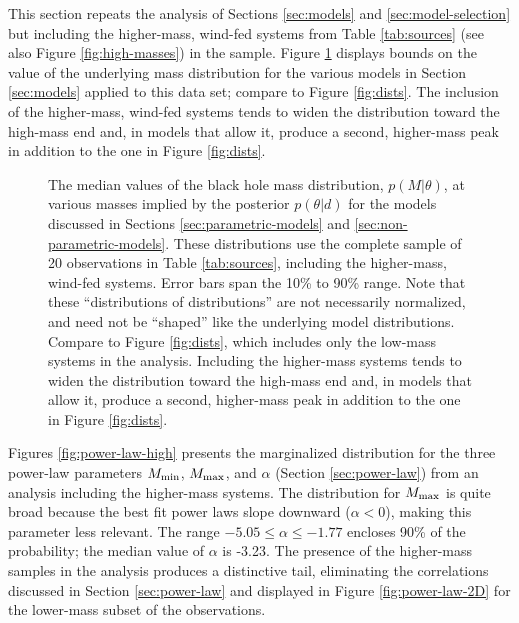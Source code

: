 \documentclass[preprint]{aastex}
\newcommand{\Mmin}{M_{\textnormal{min}}}
\newcommand{\Mmax}{M_{\textnormal{max}}}
\begin{document}
This section repeats the analysis of Sections \ref{sec:models} and
\ref{sec:model-selection} but including the higher-mass, wind-fed
systems from Table \ref{tab:sources} (see also Figure
\ref{fig:high-masses}) in the sample.  Figure
\ref{fig:high-mass-dists} displays bounds on the value of the
underlying mass distribution for the various models in Section
\ref{sec:models} applied to this data set; compare to Figure
\ref{fig:dists}.  The inclusion of the higher-mass, wind-fed systems
tends to widen the distribution toward the high-mass end and, in
models that allow it, produce a second, higher-mass peak in addition
to the one in Figure \ref{fig:dists}.

\begin{figure}
  \begin{center}
  \end{center}
  \caption{\label{fig:high-mass-dists} The median values of the black
    hole mass distribution, $p(M|\theta)$, at various masses implied
    by the posterior $p(\theta|d)$ for the models discussed in
    Sections \ref{sec:parametric-models} and
    \ref{sec:non-parametric-models}.  These distributions use the
    complete sample of 20 observations in Table \ref{tab:sources},
    including the higher-mass, wind-fed systems.  Error bars span the
    10\% to 90\% range.  Note that these ``distributions of
    distributions'' are not necessarily normalized, and need not be
    ``shaped'' like the underlying model distributions.  Compare to
    Figure \ref{fig:dists}, which includes only the low-mass systems
    in the analysis.  Including the higher-mass systems tends to widen
    the distribution toward the high-mass end and, in models that
    allow it, produce a second, higher-mass peak in addition to the
    one in Figure \ref{fig:dists}. }
\end{figure}

Figures \ref{fig:power-law-high} presents the marginalized
distribution for the three power-law parameters $\Mmin$, $\Mmax$, and
$\alpha$ (Section \ref{sec:power-law}) from an analysis including the
higher-mass systems.  The distribution for $\Mmax$ is quite broad
because the best fit power laws slope downward ($\alpha < 0$), making
this parameter less relevant.  The range $-5.05 \leq \alpha \leq
-1.77$ encloses 90\% of the probability; the median value of $\alpha$
is -3.23.  The presence of the higher-mass samples in the analysis
produces a distinctive tail, eliminating the correlations discussed in
Section \ref{sec:power-law} and displayed in Figure
\ref{fig:power-law-2D} for the lower-mass subset of the observations.
\end{document}
